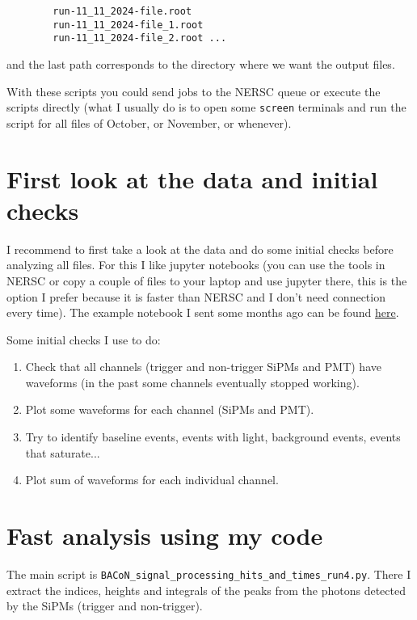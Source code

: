 \documentclass[11pt,a4paper,english,oneside, pdf]{article}
\begin{document}
	 \begin{verbatim}
	 	run-11_11_2024-file.root
	 	run-11_11_2024-file_1.root
	 	run-11_11_2024-file_2.root ...
	 \end{verbatim}
	 
	 and the last path corresponds to the directory where we want the output files.
	 
	
	With these scripts you could send jobs to the NERSC queue or execute the scripts directly (what I usually do is to open some \verb|screen| terminals and run the script for all files of October, or November, or whenever).
	
	\section{First look at the data and initial checks}
	
	I recommend to first take a look at the data and do some initial checks before analyzing all files. For this I like jupyter notebooks (you can use the tools in NERSC or copy a couple of files to your laptop and use jupyter there, this is the option I prefer because it is faster than NERSC and I don't need connection every time). The example notebook I sent some months ago can be found  \href{https://github.com/carmenromo/BACON/blob/main/example_notebooks/Run3_new_setup/Intro_to_BACoN_data.ipynb}{here}.
	
	Some initial checks I use to do:
	
	\begin{enumerate}
		\item Check that all channels (trigger and non-trigger SiPMs and PMT) have waveforms (in the past some channels eventually stopped working).
		\item Plot some waveforms for each channel (SiPMs and PMT).
		\item Try to identify baseline events, events with light, background events, events that saturate...
		\item Plot sum of waveforms for each individual channel.
	\end{enumerate}
	
	
	
	\section{Fast analysis using my code}
	
	The main script is \verb|BACoN_signal_processing_hits_and_times_run4.py|. There I extract the indices, heights and integrals of the peaks from the photons detected by the SiPMs (trigger and non-trigger).
	
\end{document}
